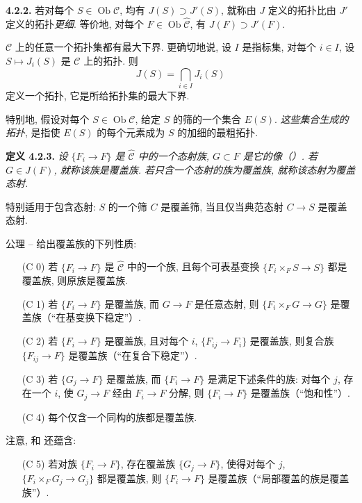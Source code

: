 \medskip
\noindent{}\textbf{4.2.2.}
若对每个 \(S\in\operatorname{Ob}\mathscr C\), 均有
\(J(S)\supset J'(S)\), 就称由 \(J\) 定义的拓扑比由 \(J'\) 定义的拓扑\emph{更细}.
等价地, 对每个 \(F\in\operatorname{Ob}\widehat{\mathscr C}\),
有 \(J(F)\supset J'(F)\).

\(\mathscr C\) 上的任意一个拓扑集都有最大下界.
更确切地说, 设 \(I\) 是指标集, 对每个 \(i\in I\),
设 \(S\mapsto J_i(S)\) 是 \(\mathscr C\) 上的拓扑. 则
\[
 J(S)=\bigcap_{i\in I}J_i(S)
\]
定义一个拓扑, 它是所给拓扑集的最大下界.

特别地, 假设对每个 \(S\in\operatorname{Ob}\mathscr C\),
给定 \(S\) 的筛的一个集合 \(E(S)\).
\emph{这些集合生成的拓扑}, 是指使 \(E(S)\) 的每个元素成为 \(S\)
的加细的最粗拓扑.

\medskip
\noindent{}\textbf{定义 4.2.3.}
\textit{设 \(\{F_i\to F\}\) 是 \(\widehat{\mathscr C}\) 中的一个态射族,
\(G\subset F\) 是它的像（）.
若 \(G\in J(F)\), 就称该族是\emph{覆盖族}.
若只含一个态射的族为覆盖族, 就称该态射为覆盖态射.}

特别适用于包含态射:
\(S\) 的一个筛 \(C\) 是覆盖筛, 当且仅当典范态射 \(C\to S\) 是覆盖态射.

公理 --
给出覆盖族的下列性质:
\begin{enumerate}
 \item[(C 0)] 若
 \(\{F_i\to F\}\) 是 \(\widehat{\mathscr C}\) 中的一个族,
 且每个可表基变换 \(\{F_i\times_FS\to S\}\) 都是覆盖族,
 则原族是覆盖族.
 \item[(C 1)] 若
 \(\{F_i\to F\}\) 是覆盖族, 而 \(G\to F\) 是任意态射,
 则 \(\{F_i\times_FG\to G\}\) 是覆盖族（“在基变换下稳定”）.
 \item[(C 2)] 若
 \(\{F_i\to F\}\) 是覆盖族, 且对每个 \(i\),
 \(\{F_{ij}\to F_i\}\) 是覆盖族, 则复合族
 \(\{F_{ij}\to F\}\) 是覆盖族（“在复合下稳定”）.
 \item[(C 3)] 若
 \(\{G_j\to F\}\) 是覆盖族, 而 \(\{F_i\to F\}\) 是满足下述条件的族:
 对每个 \(j\), 存在一个 \(i\), 使 \(G_j\to F\) 经由 \(F_i\to F\) 分解,
 则 \(\{F_i\to F\}\) 是覆盖族（“饱和性”）.
 \item[(C 4)] 每个仅含一个同构的族都是覆盖族.
\end{enumerate}
注意,  和
 还蕴含:
\begin{enumerate}
 \item[(C 5)] 若对族
 \(\{F_i\to F\}\), 存在覆盖族 \(\{G_j\to F\}\),
 使得对每个 \(j\), \(\{F_i\times_FG_j\to G_j\}\) 都是覆盖族,
 则 \(\{F_i\to F\}\) 是覆盖族（“局部覆盖的族是覆盖族”）.
\end{enumerate}

